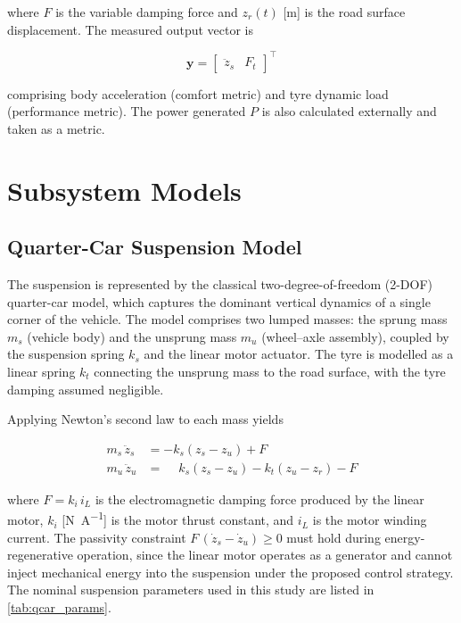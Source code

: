 where $F$ is the variable damping force and $z_r(t)$ [\si{\metre}] is
the road surface displacement. The measured output vector is

\begin{equation}
    \bm{y} =
    \begin{bmatrix}
        \ddot{z}_s & F_{t}
    \end{bmatrix}^{\!\top}
    \label{eq:outputs}
\end{equation}

comprising body acceleration (comfort metric) and tyre dynamic load (performance metric). The power generated $P$ is also calculated externally and taken as a metric.

\section{Subsystem Models}
\label{sec:subsystems}

\subsection{Quarter-Car Suspension Model}
\label{subsec:quarter_car}

The suspension is represented by the classical two-degree-of-freedom
(2-DOF) quarter-car model, which captures the dominant vertical dynamics
of a single corner of the vehicle. The model comprises two lumped
masses: the sprung mass $m_s$ (vehicle body) and the unsprung mass
$m_u$ (wheel--axle assembly), coupled by the suspension spring $k_s$
and the linear motor actuator. The tyre is modelled as a linear spring
$k_t$ connecting the unsprung mass to the road surface, with the tyre
damping assumed negligible.

Applying Newton's second law to each mass yields

\begin{align}
    m_s\,\ddot{z}_s &=
        -k_s(z_s - z_u) + F
        \label{eq:sprung_mass}\\[6pt]
    m_u\,\ddot{z}_u &=
        \phantom{-}k_s(z_s - z_u)
        - k_t(z_u - z_r)
        - F
        \label{eq:unsprung_mass}
\end{align}

where $F = k_i\,i_L$ is the electromagnetic damping force produced by
the linear motor, $k_i$ [\si{\newton\per\ampere}] is the motor thrust
constant, and $i_L$ is the motor winding current. The passivity
constraint $F\,(\dot{z}_s - \dot{z}_u) \geq 0$ must hold during
energy-regenerative operation, since the linear motor operates as a
generator and cannot inject mechanical energy into the suspension under
the proposed control strategy. The nominal suspension parameters used
in this study are listed in \cref{tab:qcar_params}.

